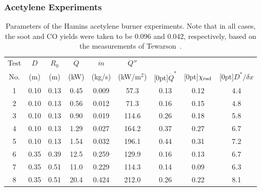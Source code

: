 \clearpage

\subsubsection{Acetylene Experiments}

\begin{table}[ht]
\caption[Parameters of the Hamins acetylene burner experiments]{Parameters of the Hamins acetylene burner experiments. Note that in all cases, the soot and CO yields were taken to be 0.096 and 0.042, respectively, based on the measurements of Tewarson~\cite{SFPE:Tewarson}.}
\begin{center}
\begin{tabular}{|c|c|c|c|c|c|c||c|c|}
\hline
Test     & $D$      & $R_0$      & $\dot{Q}$   &  $\dot{m}$            &  $\dot{Q}''$   &               &         &             \\
No.      & (m)      & (m)        & (kW)        &  (kg/s)               &  (kW/m$^2$)    & \raisebox{1.5ex}[0pt]{$\dot{Q}^*$} & \raisebox{1.5ex}[0pt]{$\chi_{\rm rad}$} & \raisebox{1.5ex}[0pt]{$D^*/\delta x$} \\ \hline \hline
1        & 0.10     & 0.13       & 0.45        &  0.009                &  57.3          & 0.13         & 0.12     & 4.4             \\ \hline
2        & 0.10     & 0.13       & 0.56        &  0.012                &  71.3          & 0.16         & 0.15     & 4.8             \\ \hline
3        & 0.10     & 0.13       & 0.90        &  0.019                &  114.6         & 0.26         & 0.18     & 5.8             \\ \hline
4        & 0.10     & 0.13       & 1.29        &  0.027                &  164.2         & 0.37         & 0.27     & 6.7             \\ \hline
5        & 0.10     & 0.13       & 1.54        &  0.032                &  196.1         & 0.44         & 0.31     & 7.2             \\ \hline
6        & 0.35     & 0.39       & 12.5        &  0.259                &  129.9         & 0.16         & 0.13     & 6.7             \\ \hline
7        & 0.35     & 0.51       & 11.0        &  0.229                &  114.3         & 0.14         & 0.09     & 6.3             \\ \hline
8        & 0.35     & 0.51       & 20.4        &  0.424                &  212.0         & 0.26         & 0.22     & 8.1             \\ \hline

\end{tabular}
\end{center}
\end{table}
